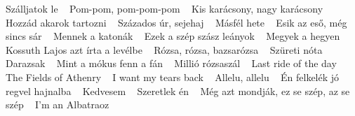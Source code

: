 \footnotesize Szálljatok le \ \textbf{\pageref{1lljatokle}} \newline
\footnotesize Pom-pom, pom-pom-pom \ \textbf{\pageref{2Cpom-pom-pom}} \newline
\footnotesize Kis karácsony, nagy karácsony \ \textbf{\pageref{C3A1csony2CnagykarC3A1csony}} \newline
\footnotesize Hozzád akarok tartozni \ \textbf{\pageref{A1dakaroktartozni}} \newline
\footnotesize Százados úr, sejehaj \ \textbf{\pageref{1zadosC3BAr2Csejehaj}} \newline
\footnotesize Másfél hete \ \textbf{\pageref{sfC3A9lhete}} \newline
\footnotesize Esik az eső, még sincs sár \ \textbf{\pageref{esC5912CmC3A9gsincssC3A1r}} \newline
\footnotesize Mennek a katonák \ \textbf{\pageref{akatonC3A1k}} \newline
\footnotesize Ezek a szép szász leányok \ \textbf{\pageref{szC3A9pszC3A1szleC3A1nyok}} \newline
\footnotesize Megyek a hegyen \ \textbf{\pageref{ahegyen}} \newline
\footnotesize Kossuth Lajos azt írta a levélbe \ \textbf{\pageref{LajosaztC3ADrtaalevC3A9lbe}} \newline
\footnotesize Rózsa, rózsa, bazsarózsa \ \textbf{\pageref{zsa2CrC3B3zsa2CbazsarC3B3zsa}} \newline
\footnotesize Szüreti nóta \ \textbf{\pageref{CretinC3B3ta}} \newline
\footnotesize Darazsak \ \textbf{\pageref{k}} \newline
\footnotesize Mint a mókus fenn a fán \ \textbf{\pageref{mC3B3kusfennafC3A1n}} \newline
\footnotesize Millió rózsaszál \ \textbf{\pageref{3B3rC3B3zsaszC3A1l}} \newline
\footnotesize Last ride of the day \ \textbf{\pageref{deoftheday}} \newline
\footnotesize The Fields of Athenry \ \textbf{\pageref{ldsofAthenry}} \newline
\footnotesize I want my tears back \ \textbf{\pageref{mytearsback}} \newline
\footnotesize Allelu, allelu \ \textbf{\pageref{allelu}} \newline
\footnotesize Én felkelék jó regvel hajnalba \ \textbf{\pageref{felkelC3A9kjC3B3regvelhajnalba}} \newline
\footnotesize Kedvesem \ \textbf{\pageref{m}} \newline
\footnotesize Szeretlek én \ \textbf{\pageref{ekC3A9n}} \newline
\footnotesize Még azt mondják, ez se szép, az se szép \ \textbf{\pageref{gaztmondjC3A1k2CezseszC3A9p2CazseszC3A9p}} \newline
\footnotesize I'm an Albatraoz \ \textbf{\pageref{nAlbatraoz}} \newline
